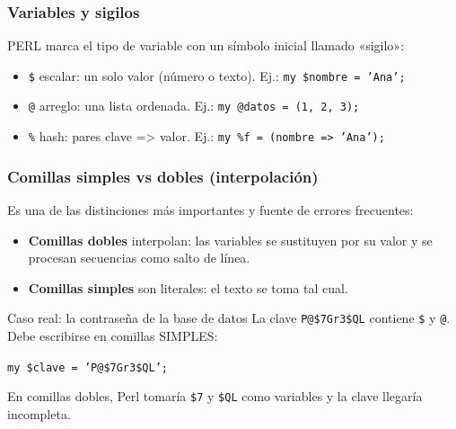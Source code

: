 \documentclass[11pt]{article}
\begin{document}
\subsubsection{Variables y sigilos}
PERL marca el tipo de variable con un símbolo inicial llamado «sigilo»:

\begin{itemize}[leftmargin=1.4em,itemsep=2pt,topsep=2pt]
\item \texttt{\$}  escalar: un solo valor (número o texto). Ej.: \texttt{my \$nombre = 'Ana';}
\item \texttt{@}  arreglo: una lista ordenada. Ej.: \texttt{my @datos = (1, 2, 3);}
\item \texttt{\%}  hash: pares clave =\textgreater{} valor. Ej.: \texttt{my \%f = (nombre =\textgreater{} 'Ana');}
\end{itemize}
\subsubsection{Comillas simples vs dobles (interpolación)}
Es una de las distinciones más importantes y fuente de errores frecuentes:

\begin{itemize}[leftmargin=1.4em,itemsep=2pt,topsep=2pt]
\item \textbf{Comillas dobles} interpolan: las variables se sustituyen por su valor y se procesan secuencias como salto de línea.
\item \textbf{Comillas simples} son literales: el texto se toma tal cual.
\end{itemize}
\begin{cajawarn}{Caso real: la contraseña de la base de datos}
La clave \texttt{P@\$7Gr3\$QL} contiene \texttt{\$} y \texttt{@}. Debe escribirse en comillas SIMPLES:\par
\texttt{my \$clave = 'P@\$7Gr3\$QL';}\par
En comillas dobles, Perl tomaría \texttt{\$7} y \texttt{\$QL} como variables y la clave llegaría incompleta.\par
\end{cajawarn}
\end{document}
